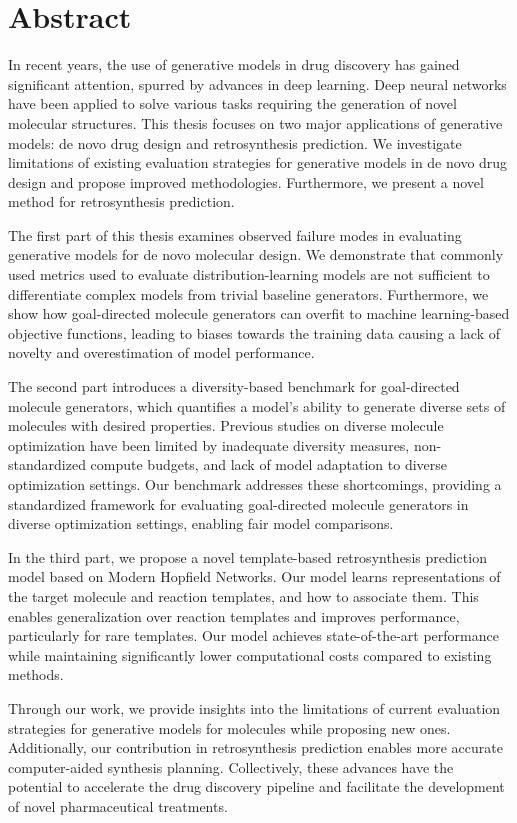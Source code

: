 
{%
\chapter*{Abstract}
In recent years, the use of generative models in drug discovery has gained significant attention,
spurred by advances in deep learning. Deep neural networks have been applied to solve various tasks
requiring the generation of novel molecular structures. This thesis focuses on two major
applications of generative models: de novo drug design and retrosynthesis prediction. We investigate
limitations of existing evaluation strategies for generative models in de novo drug design and
propose improved methodologies. Furthermore, we present a novel method for retrosynthesis
prediction.

The first part of this thesis examines observed failure modes in evaluating generative models for de
novo molecular design. We demonstrate that commonly used metrics used to evaluate
distribution-learning models are not sufficient to differentiate complex models from trivial
baseline generators. Furthermore, we show how goal-directed molecule generators can overfit to
machine learning-based objective functions, leading to biases towards the training data causing a
lack of novelty and overestimation of model performance.

The second part introduces a diversity-based benchmark for goal-directed molecule generators, which
quantifies a model's ability to generate diverse sets of molecules with desired properties. Previous
studies on diverse molecule optimization have been limited by inadequate diversity measures,
non-standardized compute budgets, and lack of model adaptation to diverse optimization settings. Our
benchmark addresses these shortcomings, providing a standardized framework for evaluating
goal-directed molecule generators in diverse optimization settings, enabling fair model
comparisons.

In the third part, we propose a novel template-based retrosynthesis prediction model based on Modern
Hopfield Networks. Our model learns representations of the target molecule and reaction templates,
and how to associate them. This enables generalization over reaction templates and improves
performance, particularly for rare templates. Our model achieves state-of-the-art performance while
maintaining significantly lower computational costs compared to existing methods.

Through our work, we provide insights into the limitations of current evaluation strategies for
generative models for molecules while proposing new ones. Additionally, our
contribution in retrosynthesis prediction enables more accurate computer-aided synthesis planning.
Collectively, these advances have the potential to accelerate the drug discovery pipeline and
facilitate the development of novel pharmaceutical treatments.
}%
